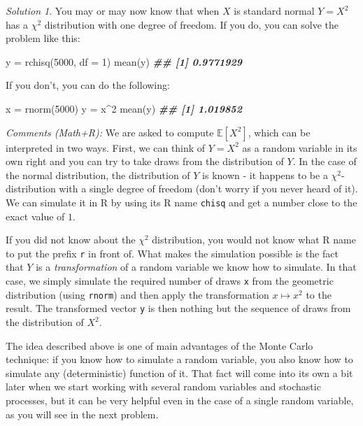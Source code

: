 \documentclass[
]{book}
\newenvironment{Shaded}{\begin{snugshade}}{\end{snugshade}}
\newcommand{\AttributeTok}[1]{\textcolor[rgb]{0.77,0.63,0.00}{#1}}
\newcommand{\DecValTok}[1]{\textcolor[rgb]{0.00,0.00,0.81}{#1}}
\newcommand{\DocumentationTok}[1]{\textcolor[rgb]{0.56,0.35,0.01}{\textbf{\textit{#1}}}}
\newcommand{\FunctionTok}[1]{\textcolor[rgb]{0.00,0.00,0.00}{#1}}
\newcommand{\NormalTok}[1]{#1}
\newcommand{\OtherTok}[1]{\textcolor[rgb]{0.56,0.35,0.01}{#1}}
\newcommand{\SpecialCharTok}[1]{\textcolor[rgb]{0.00,0.00,0.00}{#1}}
\theoremstyle{definition}
\theoremstyle{definition}
\theoremstyle{definition}
\theoremstyle{definition}
\theoremstyle{remark}
\newtheorem*{solution}{Solution}
\begin{document}
\begin{solution}
You may or may now know that when \(X\) is standard normal \(Y=X^2\) has a \(\chi^2\)
distribution with one degree of freedom. If you do, you can solve the problem
like this:

\begin{Shaded}
\begin{Highlighting}[]
\NormalTok{y }\OtherTok{=} \FunctionTok{rchisq}\NormalTok{(}\DecValTok{5000}\NormalTok{, }\AttributeTok{df =} \DecValTok{1}\NormalTok{)}
\FunctionTok{mean}\NormalTok{(y)}
\DocumentationTok{\#\# [1] 0.9771929}
\end{Highlighting}
\end{Shaded}

If you don't, you can do the following:

\begin{Shaded}
\begin{Highlighting}[]
\NormalTok{x }\OtherTok{=} \FunctionTok{rnorm}\NormalTok{(}\DecValTok{5000}\NormalTok{)}
\NormalTok{y }\OtherTok{=}\NormalTok{ x}\SpecialCharTok{\^{}}\DecValTok{2}
\FunctionTok{mean}\NormalTok{(y)}
\DocumentationTok{\#\# [1] 1.019852}
\end{Highlighting}
\end{Shaded}

\emph{Comments (Math+R):} We are asked to compute \({\mathbb{E}}[ X^2]\), which can be interpreted in
two ways. First, we can think of \(Y=X^2\) as a random variable in its own right and you
can try to take draws from the distribution of \(Y\). In the case of the normal
distribution, the distribution of \(Y\) is known - it happens to be a
\(\chi^2\)-distribution with a single degree of freedom (don't worry if you never
heard of it). We can simulate it in R by using its R name \texttt{chisq} and
get a number close to the exact value of \(1\).

If you did not know about the \(\chi^2\) distribution, you would not know what R
name to put the prefix \texttt{r} in front of. What makes the simulation possible is
the fact that \(Y\) is a \emph{transformation} of
a random variable we know how to simulate. In that case, we simply simulate the
required number of draws \texttt{x} from the geometric distribution (using \texttt{rnorm}) and
then apply the transformation \(x \mapsto x^2\) to the result. The transformed
vector \texttt{y} is then nothing but the sequence of draws from the distribution of
\(X^2\).

The idea described above is one of main advantages of the Monte Carlo technique:
if you know how to simulate a random variable, you also know how to simulate
any (deterministic) function of it. That fact will come into its own a bit later
when we start working with several random variables and stochastic processes,
but it can be very helpful even in the case of a single random variable, as you
will see in the next problem.
\end{solution}
\end{document}
